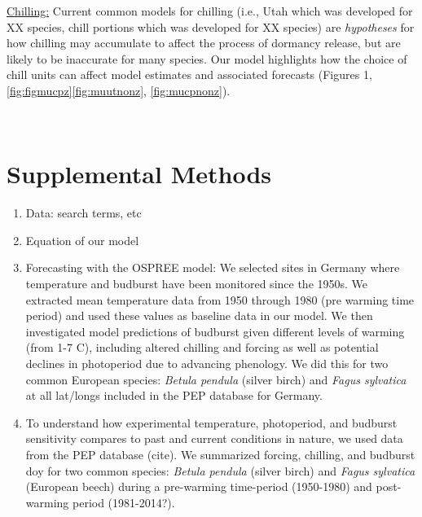 \documentclass{article}
\begin{document}
\par \underline{Chilling:} Current common models for chilling (i.e., Utah which was developed for XX species,  chill portions which was developed for XX species) are \emph{hypotheses} for how chilling may accumulate to affect the process of dormancy release, but are likely to be inaccurate for many species. Our model highlights how the choice of chill units can affect model estimates and associated forecasts (Figures 1,\ref{fig:figmucpz}\ref{fig:muutnonz}, \ref{fig:mucpnonz}). 

\
\section*{Supplemental Methods}

\begin{enumerate}
\item Data: search terms, etc

\item Equation of our model

\item Forecasting with the OSPREE model: We selected sites in Germany where temperature and budburst have been monitored since the 1950s. We extracted mean temperature data from 1950 through 1980 (pre warming time period) and used these values as baseline data in our model. We then investigated model predictions of budburst given different levels of warming (from 1-7 \degree C), including altered chilling and forcing as well as potential declines in photoperiod due to advancing phenology. We did this for two common European species: \emph{Betula pendula} (silver birch) and \emph{Fagus sylvatica} at all lat/longs included in the PEP database for Germany. 

\item  To understand how experimental temperature, photoperiod, and budburst sensitivity compares to past and current conditions in nature, we used data from the PEP database (cite). We summarized forcing, chilling, and budburst doy for two common species: \emph{Betula pendula} (silver birch) and \emph{Fagus sylvatica} (European beech) during a pre-warming time-period (1950-1980) and post-warming period (1981-2014?). 

\end{enumerate}
\end{document}
